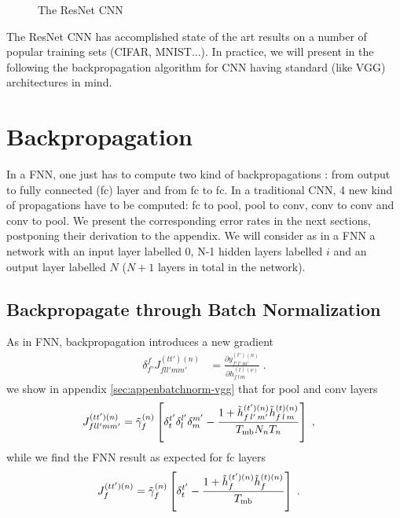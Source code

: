 \begin{figure}[H]
\begin{center}
\caption{The ResNet CNN}
\end{center}
\end{figure}


The ResNet CNN has accomplished state of the art results on a number of popular training sets (CIFAR, MNIST...). In practice, we will present in the following the backpropagation algorithm for CNN having standard (like VGG) architectures in mind.

\section{Backpropagation}

In a FNN, one just has to compute two kind of backpropagations : from output to fully connected (fc) layer and from fc to fc. In a traditional CNN, 4 new kind of propagations have to be computed: fc to pool, pool to conv, conv to conv and conv to pool. We present the corresponding error rates in the next sections, postponing their derivation to the appendix. We will consider as in a FNN a network with an input layer labelled $0$, N-1 hidden layers labelled $i$ and an output layer labelled $N$ ($N+1$ layers in total in the network).


\subsection{Backpropagate through Batch Normalization} \label{sec:BackpropbatchnormCNN}

As in FNN, backpropagation introduces a new gradient 
\begin{align}
\delta^f_{f'}J^{(tt')(n)}_{fll'mm'}&=
%
\frac{\partial y^{(t')(n)}_{f'\,l'\,m'}}{\partial h_{f\,l\,m}^{(t)(\nu)}}\;.
\end{align}
we show in appendix \ref{sec:appenbatchnorm-vgg} that for pool and conv layers
\begin{align}
J^{(tt')(n)}_{fll'mm'}&=\tilde{\gamma}^{(n)}_f \left[\delta^{t'}_t\delta^{l'}_l\delta^{m'}_m-
%
\frac{1+\tilde{h}_{f\,l'\,m'}^{(t')(n)}\tilde{h}_{f\,l\,m}^{(t)(n)}}{T_{{\rm mb}}N_nT_n}\right]\;,
\end{align}
while we find the FNN result as expected for fc layers 
\begin{align}
J^{(tt')(n)}_{f}&=\tilde{\gamma}^{(n)}_f \left[\delta^{t'}_t-
%
\frac{1+\tilde{h}_{f}^{(t')(n)}\tilde{h}_{f}^{(t)(n)}}{T_{{\rm mb}}}\right]\;.
\end{align}

